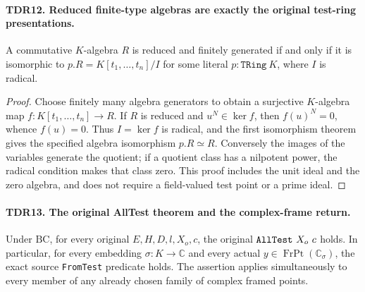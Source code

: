 \documentclass[11pt,a4paper]{article}
\numberwithin{equation}{section}
\theoremstyle{remark}\newtheorem{remark}[theorem]{Remark}
\begin{document}
\paragraph{TDR12. Reduced finite-type algebras are exactly the original test-ring presentations.}
\label{claim:TDR12}
A commutative \(K\)-algebra \(R\) is reduced and finitely
generated if and only if it is isomorphic to
\(p.R=K[t_1,\ldots,t_n]/I\) for some literal
\(p:\texttt{TRing}\ K\), where \(I\) is radical.

\begin{proof}
Choose finitely many algebra generators to obtain a surjective
\(K\)-algebra map \(f:K[t_1,\ldots,t_n]\to R\).
If \(R\) is reduced and \(u^N\in\ker f\), then
\(f(u)^N=0\), whence \(f(u)=0\).  Thus \(I=\ker f\)
is radical, and the first isomorphism theorem gives the specified
algebra isomorphism \(p.R\simeq R\).  Conversely the images
of the variables generate the quotient; if a quotient class has
a nilpotent power, the radical condition makes that class zero.
This proof includes the unit ideal and the zero algebra, and
does not require a field-valued test point or a prime ideal.
\end{proof}

\paragraph{TDR13. The original AllTest theorem and the complex-frame return.}
\label{claim:TDR13}
Under \(\mathrm{BC}\), for every original \(E,H,D,l,X_o,c\),
the original \(\texttt{All\allowbreak Test}\ X_o\ c\) holds.  In
particular, for every embedding \(\sigma:K\to\mathbb C\)
and every actual \(y\in\operatorname{FrPt}(\mathbb C_\sigma)\),
the exact source \texttt{From\allowbreak Test} predicate holds.
The assertion applies simultaneously to every member of any
already chosen family of complex framed points.
\end{document}
